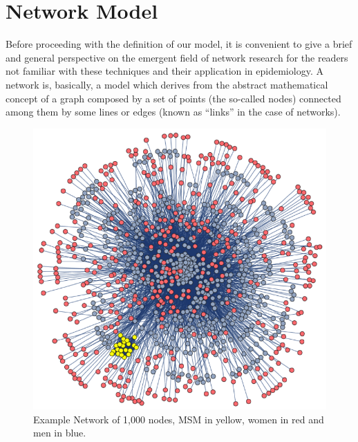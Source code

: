 \section{Network Model}

Before proceeding with the definition of our model, it is convenient to give a brief and general perspective on the emergent field of network research for the readers not familiar with these techniques and their application in epidemiology. A network is, basically, a model which derives from the abstract mathematical concept of a graph composed by a set of points (the so-called nodes) connected among them by some lines or edges (known as ``links'' in the case of networks).

\begin{figure}[ht]
	\centering
	\includegraphics[scale=0.7]{IMG/LSP}
	\caption{Example Network of 1,000 nodes, MSM in yellow, women in red and men in blue.}
	\label{LSPnetwork}
\end{figure}


